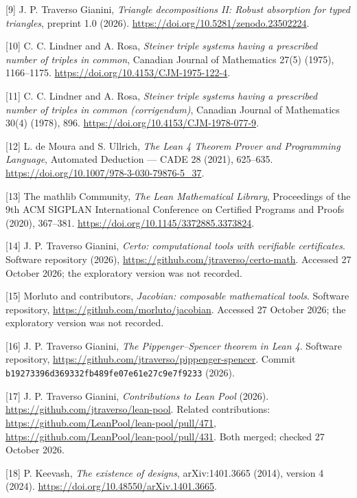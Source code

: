\documentclass[english,11pt,a4paper]{article}
\begin{document}
{[}9{]} J. P. Traverso Gianini, \emph{Triangle decompositions II: Robust absorption for typed triangles}, preprint 1.0 (2026). \url{https://doi.org/10.5281/zenodo.23502224}.

{[}10{]} C. C. Lindner and A. Rosa, \emph{Steiner triple systems having a prescribed number of triples in common}, Canadian Journal of Mathematics 27(5) (1975), 1166--1175. \url{https://doi.org/10.4153/CJM-1975-122-4}.

{[}11{]} C. C. Lindner and A. Rosa, \emph{Steiner triple systems having a prescribed number of triples in common (corrigendum)}, Canadian Journal of Mathematics 30(4) (1978), 896. \url{https://doi.org/10.4153/CJM-1978-077-9}.

{[}12{]} L. de Moura and S. Ullrich, \emph{The Lean 4 Theorem Prover and Programming Language}, Automated Deduction --- CADE 28 (2021), 625--635. \url{https://doi.org/10.1007/978-3-030-79876-5_37}.

{[}13{]} The mathlib Community, \emph{The Lean Mathematical Library}, Proceedings of the 9th ACM SIGPLAN International Conference on Certified Programs and Proofs (2020), 367--381. \url{https://doi.org/10.1145/3372885.3373824}.

{[}14{]} J. P. Traverso Gianini, \emph{Certo: computational tools with verifiable certificates}. Software repository (2026), \url{https://github.com/jtraverso/certo-math}. Accessed 27 October 2026; the exploratory version was not recorded.

{[}15{]} Morluto and contributors, \emph{Jacobian: composable mathematical tools}. Software repository, \url{https://github.com/morluto/jacobian}. Accessed 27 October 2026; the exploratory version was not recorded.

{[}16{]} J. P. Traverso Gianini, \emph{The Pippenger--Spencer theorem in Lean 4}. Software repository, \url{https://github.com/jtraverso/pippenger-spencer}. Commit \texttt{b1927339\allowbreak{}6d369332\allowbreak{}fb489fe0\allowbreak{}7e61e27c\allowbreak{}9e7f9233} (2026).

{[}17{]} J. P. Traverso Gianini, \emph{Contributions to Lean Pool} (2026). \url{https://github.com/jtraverso/lean-pool}. Related contributions: \url{https://github.com/LeanPool/lean-pool/pull/471}, \url{https://github.com/LeanPool/lean-pool/pull/431}. Both merged; checked 27 October 2026.

{[}18{]} P. Keevash, \emph{The existence of designs}, arXiv:1401.3665 (2014), version 4 (2024). \url{https://doi.org/10.48550/arXiv.1401.3665}.
\end{document}

